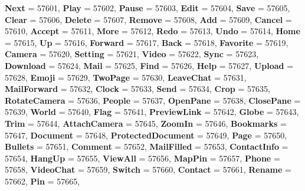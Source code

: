 \begin{DoxyCompactItemize}
{\bfseries Next} = 57601, 
{\bfseries Play} = 57602, 
{\bfseries Pause} = 57603, 
\newline
{\bfseries Edit} = 57604, 
{\bfseries Save} = 57605, 
{\bfseries Clear} = 57606, 
{\bfseries Delete} = 57607, 
\newline
{\bfseries Remove} = 57608, 
{\bfseries Add} = 57609, 
{\bfseries Cancel} = 57610, 
{\bfseries Accept} = 57611, 
\newline
{\bfseries More} = 57612, 
{\bfseries Redo} = 57613, 
{\bfseries Undo} = 57614, 
{\bfseries Home} = 57615, 
\newline
{\bfseries Up} = 57616, 
{\bfseries Forward} = 57617, 
{\bfseries Back} = 57618, 
{\bfseries Favorite} = 57619, 
\newline
{\bfseries Camera} = 57620, 
{\bfseries Setting} = 57621, 
{\bfseries Video} = 57622, 
{\bfseries Sync} = 57623, 
\newline
{\bfseries Download} = 57624, 
{\bfseries Mail} = 57625, 
{\bfseries Find} = 57626, 
{\bfseries Help} = 57627, 
\newline
{\bfseries Upload} = 57628, 
{\bfseries Emoji} = 57629, 
{\bfseries Two\+Page} = 57630, 
{\bfseries Leave\+Chat} = 57631, 
\newline
{\bfseries Mail\+Forward} = 57632, 
{\bfseries Clock} = 57633, 
{\bfseries Send} = 57634, 
{\bfseries Crop} = 57635, 
\newline
{\bfseries Rotate\+Camera} = 57636, 
{\bfseries People} = 57637, 
{\bfseries Open\+Pane} = 57638, 
{\bfseries Close\+Pane} = 57639, 
\newline
{\bfseries World} = 57640, 
{\bfseries Flag} = 57641, 
{\bfseries Preview\+Link} = 57642, 
{\bfseries Globe} = 57643, 
\newline
{\bfseries Trim} = 57644, 
{\bfseries Attach\+Camera} = 57645, 
{\bfseries Zoom\+In} = 57646, 
{\bfseries Bookmarks} = 57647, 
\newline
{\bfseries Document} = 57648, 
{\bfseries Protected\+Document} = 57649, 
{\bfseries Page} = 57650, 
{\bfseries Bullets} = 57651, 
\newline
{\bfseries Comment} = 57652, 
{\bfseries Mail\+Filled} = 57653, 
{\bfseries Contact\+Info} = 57654, 
{\bfseries Hang\+Up} = 57655, 
\newline
{\bfseries View\+All} = 57656, 
{\bfseries Map\+Pin} = 57657, 
{\bfseries Phone} = 57658, 
{\bfseries Video\+Chat} = 57659, 
\newline
{\bfseries Switch} = 57660, 
{\bfseries Contact} = 57661, 
{\bfseries Rename} = 57662, 
{\bfseries Pin} = 57665, 

\end{DoxyCompactItemize}
